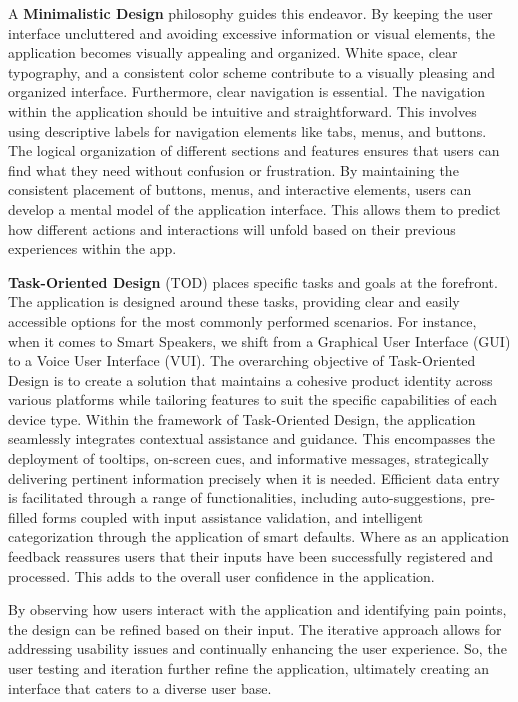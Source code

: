 A \textbf{Minimalistic Design} philosophy guides this endeavor. By keeping the user interface uncluttered and avoiding 
excessive information or visual elements, the application becomes visually appealing and organized. White space, clear 
typography, and a consistent color scheme contribute to a visually pleasing and organized interface.
Furthermore, clear navigation is essential. The navigation within the application should be intuitive and 
straightforward. This involves using descriptive labels for navigation elements like tabs, menus, and buttons. 
The logical organization of different sections and features ensures that users can find what they need without 
confusion or frustration. By maintaining the consistent placement of buttons, menus, and interactive elements, users 
can develop a mental model of the application interface. This allows them to predict how different actions and 
interactions will unfold based on their previous experiences within the app.

\textbf{Task-Oriented Design} (TOD) places specific tasks and goals at the forefront. The application is designed 
around these tasks, providing clear and easily accessible options for the most commonly performed scenarios.
For instance, when it comes to Smart Speakers, we shift from a Graphical User Interface (GUI) to a Voice User Interface 
(VUI). The overarching objective of Task-Oriented Design is to create a solution that maintains a cohesive product 
identity across various platforms while tailoring features to suit the specific capabilities of each device type.
Within the framework of Task-Oriented Design, the application seamlessly integrates contextual assistance and guidance. 
This encompasses the deployment of tooltips, on-screen cues, and informative messages, strategically delivering 
pertinent information precisely when it is needed. Efficient data entry is facilitated through a range of 
functionalities, including auto-suggestions, pre-filled forms coupled with input assistance validation, and 
intelligent categorization through the application of smart defaults. Where as an application feedback reassures users 
that their inputs have been successfully registered and processed. This adds to the overall user confidence in the 
application.

By observing how users interact with the application and identifying pain points, the design can be refined based on 
their input. The iterative approach allows for addressing usability issues and continually enhancing the user 
experience. So, the user testing and iteration further refine the application, ultimately creating an interface that 
caters to a diverse user base.

